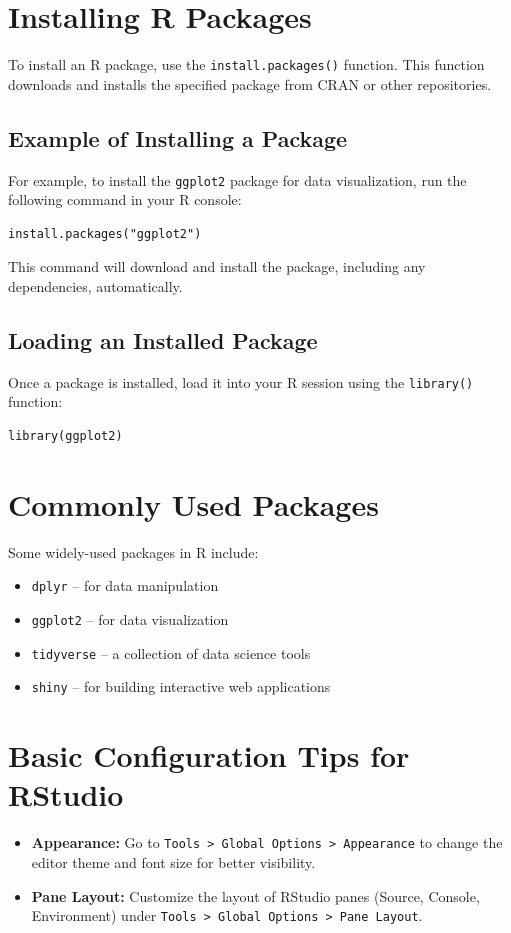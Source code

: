 \documentclass[12pt]{book}
\begin{document}
\section{Installing R Packages}
To install an R package, use the \texttt{install.packages()} function. This function downloads and installs the specified package from CRAN or other repositories.

\subsection{Example of Installing a Package}
For example, to install the \texttt{ggplot2} package for data visualization, run the following command in your R console:
\begin{verbatim}
install.packages("ggplot2")
\end{verbatim}
This command will download and install the package, including any dependencies, automatically.

\subsection{Loading an Installed Package}
Once a package is installed, load it into your R session using the \texttt{library()} function:
\begin{verbatim}
library(ggplot2)
\end{verbatim}

\section{Commonly Used Packages}
Some widely-used packages in R include:
\begin{itemize}
    \item \texttt{dplyr} – for data manipulation
    \item \texttt{ggplot2} – for data visualization
    \item \texttt{tidyverse} – a collection of data science tools
    \item \texttt{shiny} – for building interactive web applications
\end{itemize}




\section{Basic Configuration Tips for RStudio}
\begin{itemize}
    \item \textbf{Appearance:} Go to \texttt{Tools > Global Options > Appearance} to change the editor theme and font size for better visibility.
    \item \textbf{Pane Layout:} Customize the layout of RStudio panes (Source, Console, Environment) under \texttt{Tools > Global Options > Pane Layout}.
\end{itemize}
\end{document}
